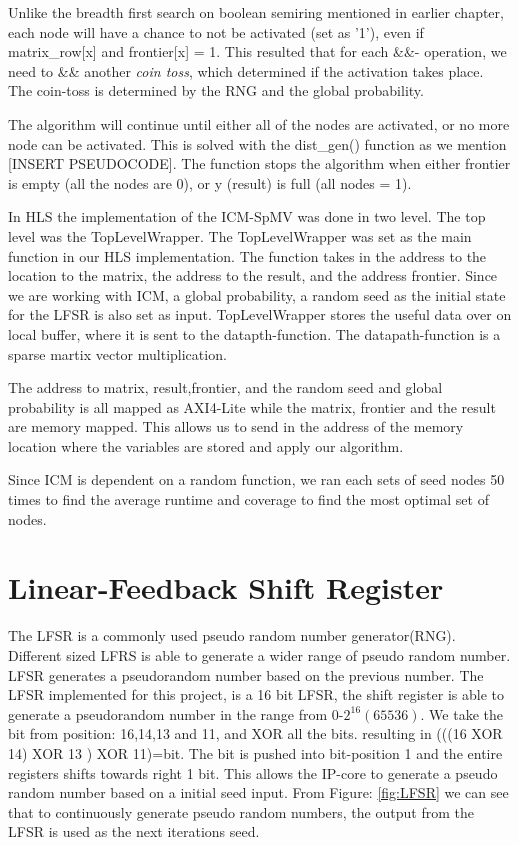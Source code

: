 Unlike the breadth first search on boolean semiring mentioned in earlier chapter, each node will have a chance to not be activated (set as '1'), even if matrix\_row[x] and frontier[x] = 1. This resulted that for each \&\&- operation, we need to \&\& another \textit{coin toss}, which determined if the activation takes place. The coin-toss is determined by the RNG and the global probability. 

The algorithm will continue until either all of the nodes are activated, or no more node can be activated. This is solved with the dist\_gen() function as we mention [INSERT PSEUDOCODE]. The function stops the algorithm when either frontier is empty (all the nodes are 0), or y (result) is full (all nodes = 1). 

In HLS the implementation of the ICM-SpMV was done in two level. The top level was the TopLevelWrapper. The TopLevelWrapper was set as the main function in our HLS implementation. The function takes in the address to the location to the matrix, the address to the result, and the address frontier. Since we are working with ICM, a global probability, a random seed as the initial state for the LFSR is also set as input. TopLevelWrapper stores the useful data over on local buffer, where it is sent to the datapth-function. The datapath-function is a sparse martix vector multiplication. 

The address to matrix, result,frontier, and the random seed and global probability is all mapped as AXI4-Lite while the matrix, frontier and the result are memory mapped. This allows us to send in the address of the memory location where the variables are stored and apply our algorithm. 
 
Since ICM is dependent on a random function, we ran each sets of seed nodes 50 times to find the average runtime and coverage to find the most optimal set of nodes.

\section{Linear-Feedback Shift Register}
The LFSR is a commonly used pseudo random number generator(RNG)\citep{murase1992linear}. Different sized LFRS is able to generate a wider range of pseudo random number. LFSR generates a pseudorandom number based on the previous number. The LFSR implemented for this project, is a 16 bit LFSR, the shift register is able to generate a pseudorandom number in the range from 0-$2^{16}(65536)$. We take the bit from position: 16,14,13 and 11, and XOR all the bits. resulting in (((16 XOR 14) XOR 13 ) XOR 11)=bit. The bit is pushed into bit-position 1 and the entire registers shifts towards right 1 bit. 
This allows the IP-core to generate a pseudo random number based on a initial seed input. From Figure: \ref{fig:LFSR} we can see that to continuously generate pseudo random numbers, the output from the LFSR is used as the next iterations seed. 

